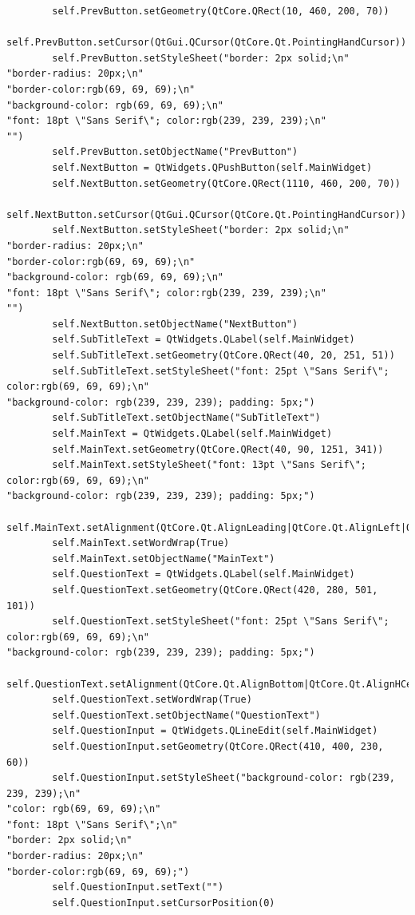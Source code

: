 \documentclass{article}
\begin{document}
\begin{lstlisting}
        self.PrevButton.setGeometry(QtCore.QRect(10, 460, 200, 70))
        self.PrevButton.setCursor(QtGui.QCursor(QtCore.Qt.PointingHandCursor))
        self.PrevButton.setStyleSheet("border: 2px solid;\n"
"border-radius: 20px;\n"
"border-color:rgb(69, 69, 69);\n"
"background-color: rgb(69, 69, 69);\n"
"font: 18pt \"Sans Serif\"; color:rgb(239, 239, 239);\n"
"")
        self.PrevButton.setObjectName("PrevButton")
        self.NextButton = QtWidgets.QPushButton(self.MainWidget)
        self.NextButton.setGeometry(QtCore.QRect(1110, 460, 200, 70))
        self.NextButton.setCursor(QtGui.QCursor(QtCore.Qt.PointingHandCursor))
        self.NextButton.setStyleSheet("border: 2px solid;\n"
"border-radius: 20px;\n"
"border-color:rgb(69, 69, 69);\n"
"background-color: rgb(69, 69, 69);\n"
"font: 18pt \"Sans Serif\"; color:rgb(239, 239, 239);\n"
"")
        self.NextButton.setObjectName("NextButton")
        self.SubTitleText = QtWidgets.QLabel(self.MainWidget)
        self.SubTitleText.setGeometry(QtCore.QRect(40, 20, 251, 51))
        self.SubTitleText.setStyleSheet("font: 25pt \"Sans Serif\"; color:rgb(69, 69, 69);\n"
"background-color: rgb(239, 239, 239); padding: 5px;")
        self.SubTitleText.setObjectName("SubTitleText")
        self.MainText = QtWidgets.QLabel(self.MainWidget)
        self.MainText.setGeometry(QtCore.QRect(40, 90, 1251, 341))
        self.MainText.setStyleSheet("font: 13pt \"Sans Serif\"; color:rgb(69, 69, 69);\n"
"background-color: rgb(239, 239, 239); padding: 5px;")
        self.MainText.setAlignment(QtCore.Qt.AlignLeading|QtCore.Qt.AlignLeft|QtCore.Qt.AlignTop)
        self.MainText.setWordWrap(True)
        self.MainText.setObjectName("MainText")
        self.QuestionText = QtWidgets.QLabel(self.MainWidget)
        self.QuestionText.setGeometry(QtCore.QRect(420, 280, 501, 101))
        self.QuestionText.setStyleSheet("font: 25pt \"Sans Serif\"; color:rgb(69, 69, 69);\n"
"background-color: rgb(239, 239, 239); padding: 5px;")
        self.QuestionText.setAlignment(QtCore.Qt.AlignBottom|QtCore.Qt.AlignHCenter)
        self.QuestionText.setWordWrap(True)
        self.QuestionText.setObjectName("QuestionText")
        self.QuestionInput = QtWidgets.QLineEdit(self.MainWidget)
        self.QuestionInput.setGeometry(QtCore.QRect(410, 400, 230, 60))
        self.QuestionInput.setStyleSheet("background-color: rgb(239, 239, 239);\n"
"color: rgb(69, 69, 69);\n"
"font: 18pt \"Sans Serif\";\n"
"border: 2px solid;\n"
"border-radius: 20px;\n"
"border-color:rgb(69, 69, 69);")
        self.QuestionInput.setText("")
        self.QuestionInput.setCursorPosition(0)

\end{lstlisting}
\end{document}
